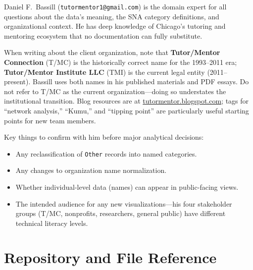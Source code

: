 \documentclass[12pt]{article}
\begin{document}
Daniel F.~Bassill (\texttt{tutormentor1@gmail.com}) is the domain expert
for all questions about the data's meaning, the SNA category definitions,
and organizational context. He has deep knowledge of Chicago's tutoring
and mentoring ecosystem that no documentation can fully substitute.

When writing about the client organization, note that \textbf{Tutor/Mentor
Connection} (T/MC) is the historically correct name for the 1993--2011 era;
\textbf{Tutor/Mentor Institute LLC} (TMI) is the current legal entity
(2011--present). Bassill uses both names in his published materials and PDF
essays. Do not refer to T/MC as the current organization---doing so
understates the institutional transition. Blog resources are at
\href{https://tutormentor.blogspot.com}{tutormentor.blogspot.com}; tags for
``network analysis,'' ``Kumu,'' and ``tipping point'' are particularly
useful starting points for new team members.

Key things to confirm with him before major analytical decisions:

\begin{itemize}[leftmargin=1.5em]
  \item Any reclassification of \texttt{Other} records into named categories.
  \item Any changes to organization name normalization.
  \item Whether individual-level data (names) can appear in public-facing views.
  \item The intended audience for any new visualizations---his four
        stakeholder groups (T/MC, nonprofits, researchers, general public)
        have different technical literacy levels.
\end{itemize}

\section{Repository and File Reference}
\end{document}
